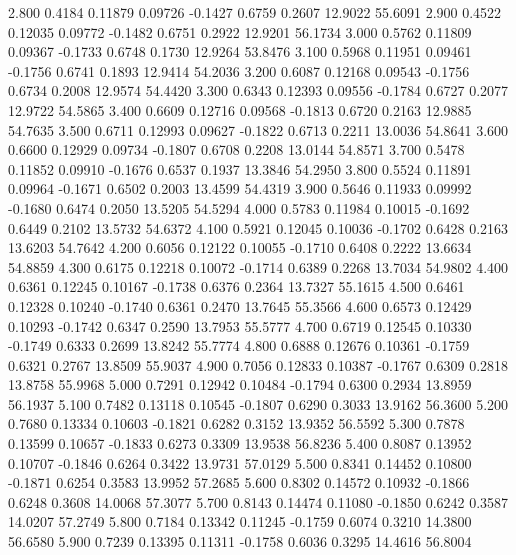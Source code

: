    2.800   0.4184   0.11879   0.09726  -0.1427   0.6759   0.2607  12.9022  55.6091
   2.900   0.4522   0.12035   0.09772  -0.1482   0.6751   0.2922  12.9201  56.1734
   3.000   0.5762   0.11809   0.09367  -0.1733   0.6748   0.1730  12.9264  53.8476
   3.100   0.5968   0.11951   0.09461  -0.1756   0.6741   0.1893  12.9414  54.2036
   3.200   0.6087   0.12168   0.09543  -0.1756   0.6734   0.2008  12.9574  54.4420
   3.300   0.6343   0.12393   0.09556  -0.1784   0.6727   0.2077  12.9722  54.5865
   3.400   0.6609   0.12716   0.09568  -0.1813   0.6720   0.2163  12.9885  54.7635
   3.500   0.6711   0.12993   0.09627  -0.1822   0.6713   0.2211  13.0036  54.8641
   3.600   0.6600   0.12929   0.09734  -0.1807   0.6708   0.2208  13.0144  54.8571
   3.700   0.5478   0.11852   0.09910  -0.1676   0.6537   0.1937  13.3846  54.2950
   3.800   0.5524   0.11891   0.09964  -0.1671   0.6502   0.2003  13.4599  54.4319
   3.900   0.5646   0.11933   0.09992  -0.1680   0.6474   0.2050  13.5205  54.5294
   4.000   0.5783   0.11984   0.10015  -0.1692   0.6449   0.2102  13.5732  54.6372
   4.100   0.5921   0.12045   0.10036  -0.1702   0.6428   0.2163  13.6203  54.7642
   4.200   0.6056   0.12122   0.10055  -0.1710   0.6408   0.2222  13.6634  54.8859
   4.300   0.6175   0.12218   0.10072  -0.1714   0.6389   0.2268  13.7034  54.9802
   4.400   0.6361   0.12245   0.10167  -0.1738   0.6376   0.2364  13.7327  55.1615
   4.500   0.6461   0.12328   0.10240  -0.1740   0.6361   0.2470  13.7645  55.3566
   4.600   0.6573   0.12429   0.10293  -0.1742   0.6347   0.2590  13.7953  55.5777
   4.700   0.6719   0.12545   0.10330  -0.1749   0.6333   0.2699  13.8242  55.7774
   4.800   0.6888   0.12676   0.10361  -0.1759   0.6321   0.2767  13.8509  55.9037
   4.900   0.7056   0.12833   0.10387  -0.1767   0.6309   0.2818  13.8758  55.9968
   5.000   0.7291   0.12942   0.10484  -0.1794   0.6300   0.2934  13.8959  56.1937
   5.100   0.7482   0.13118   0.10545  -0.1807   0.6290   0.3033  13.9162  56.3600
   5.200   0.7680   0.13334   0.10603  -0.1821   0.6282   0.3152  13.9352  56.5592
   5.300   0.7878   0.13599   0.10657  -0.1833   0.6273   0.3309  13.9538  56.8236
   5.400   0.8087   0.13952   0.10707  -0.1846   0.6264   0.3422  13.9731  57.0129
   5.500   0.8341   0.14452   0.10800  -0.1871   0.6254   0.3583  13.9952  57.2685
   5.600   0.8302   0.14572   0.10932  -0.1866   0.6248   0.3608  14.0068  57.3077
   5.700   0.8143   0.14474   0.11080  -0.1850   0.6242   0.3587  14.0207  57.2749
   5.800   0.7184   0.13342   0.11245  -0.1759   0.6074   0.3210  14.3800  56.6580
   5.900   0.7239   0.13395   0.11311  -0.1758   0.6036   0.3295  14.4616  56.8004
